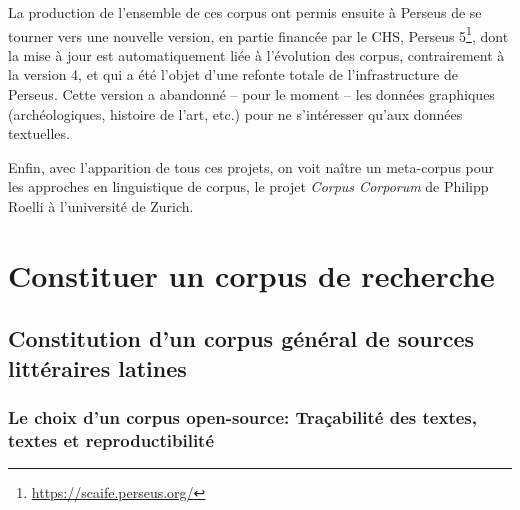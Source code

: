 La production de l'ensemble de ces corpus ont permis ensuite à Perseus de se tourner vers une nouvelle version, en partie financée par le CHS, Perseus 5\footnote{\url{https://scaife.perseus.org/}}, dont la mise à jour est automatiquement liée à l'évolution des corpus, contrairement à la version 4, et qui a été l'objet d'une refonte totale de l'infrastructure de Perseus. Cette version a abandonné -- pour le moment -- les données graphiques (archéologiques, histoire de l'art, etc.) pour ne s'intéresser qu'aux données textuelles.

Enfin, avec l'apparition de tous ces projets, on voit naître un meta-corpus pour les approches en linguistique de corpus, le projet \textit{Corpus Corporum} de Philipp Roelli à l'université de Zurich.






\section{Constituer un corpus de recherche}

\subsection{Constitution d’un corpus général de sources littéraires latines}

\subsubsection{Le choix d’un corpus open-source: Traçabilité des textes, textes et reproductibilité}


